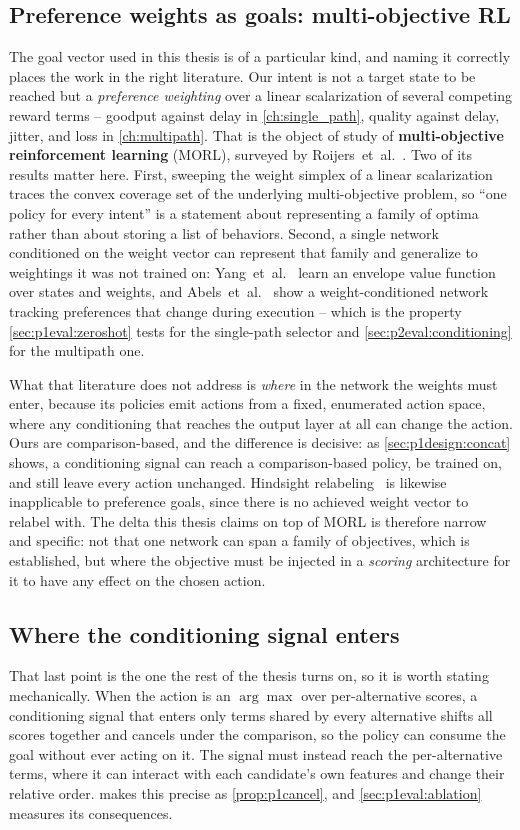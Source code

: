 \subsection{Preference weights as goals: multi-objective RL}
\label{sec:background:morl}
The goal vector used in this thesis is of a particular kind, and naming it correctly places the work in
the right literature. Our intent is not a target state to be reached but a \emph{preference weighting}
over a linear scalarization of several competing reward terms -- goodput against delay in
\cref{ch:single_path}, quality against delay, jitter, and loss in \cref{ch:multipath}. That is the
object of study of \textbf{multi-objective reinforcement learning} (MORL), surveyed by
Roijers~et~al.~\cite{Roijers2013}. Two of its results matter here. First, sweeping the weight simplex
of a linear scalarization traces the convex coverage set of the underlying multi-objective problem, so
``one policy for every intent'' is a statement about representing a family of optima rather than about
storing a list of behaviors. Second, a single network conditioned on the weight vector can represent
that family and generalize to weightings it was not trained on: Yang~et~al.~\cite{Yang2019} learn an
envelope value function over states and weights, and Abels~et~al.~\cite{Abels2019} show a
weight-conditioned network tracking preferences that change during execution -- which is the property
\cref{sec:p1eval:zeroshot} tests for the single-path selector and \cref{sec:p2eval:conditioning} for
the multipath one.

What that literature does not address is \emph{where} in the network the weights must enter, because
its policies emit actions from a fixed, enumerated action space, where any conditioning that reaches
the output layer at all can change the action. Ours are comparison-based, and the difference is
decisive: as \cref{sec:p1design:concat} shows, a conditioning signal can reach a comparison-based
policy, be trained on, and still leave every action unchanged. Hindsight relabeling~\cite{Andrychowicz2017}
is likewise inapplicable to preference goals, since there is no achieved weight vector to relabel with.
The delta this thesis claims on top of MORL is therefore narrow and specific: not that one network can
span a family of objectives, which is established, but where the objective must be injected in a
\emph{scoring} architecture for it to have any effect on the chosen action.

\subsection{Where the conditioning signal enters}
That last point is the one the rest of the thesis turns on, so it is worth stating mechanically. When
the action is an $\arg\max$ over per-alternative scores, a
conditioning signal that enters only terms shared by every alternative shifts all scores together and
cancels under the comparison, so the policy can consume the goal without ever acting on it. The signal
must instead reach the per-alternative terms, where it can interact with each candidate's own features
and change their relative order.  makes this precise as
\cref{prop:p1cancel}, and \cref{sec:p1eval:ablation} measures its consequences.